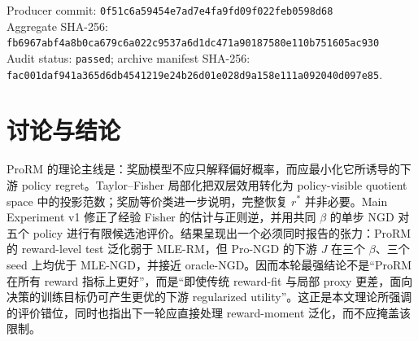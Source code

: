 \documentclass[UTF8,11pt,a4paper,fontset=none]{ctexart}
\begin{document}
\begin{flushleft}\footnotesize\color{gray}
Producer commit: \texttt{0f51c6a59454e7ad7e4fa9fd09f022feb0598d68}\\
Aggregate SHA-256: \texttt{fb6967abf4a8b0ca679c6a022c9537a6d1dc471a90187580e110b751605ac930}\\
Audit status: \texttt{passed}; archive manifest SHA-256:
\texttt{fac001daf941a365d6db4541219e24b26d01e028d9a158e111a092040d097e85}.
\end{flushleft}

\section*{讨论与结论}

ProRM 的理论主线是：奖励模型不应只解释偏好概率，而应最小化它所诱导的下游 policy regret。Taylor--Fisher 局部化把双层效用转化为 policy-visible quotient space 中的投影范数；奖励等价类进一步说明，完整恢复 $r^*$ 并非必要。Main Experiment v1 修正了经验 Fisher 的估计与正则逆，并用共同 $\beta$ 的单步 NGD 对五个 policy 进行有限候选池评价。结果呈现出一个必须同时报告的张力：ProRM 的 reward-level test 泛化弱于 MLE-RM，但 Pro-NGD 的下游 $J$ 在三个 $\beta$、三个 seed 上均优于 MLE-NGD，并接近 oracle-NGD。因而本轮最强结论不是“ProRM 在所有 reward 指标上更好”，而是“即使传统 reward-fit 与局部 proxy 更差，面向决策的训练目标仍可产生更优的下游 regularized utility”。这正是本文理论所强调的评价错位，同时也指出下一轮应直接处理 reward-moment 泛化，而不应掩盖该限制。
\end{document}
